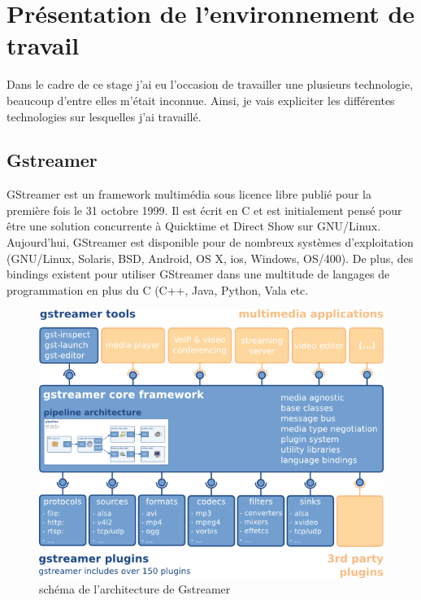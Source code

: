 \chapter{Présentation de l'environnement de travail}
Dans le cadre de ce stage j'ai eu l'occasion de travailler une plusieurs technologie, beaucoup d'entre elles m'était inconnue. Ainsi, je vais expliciter les différentes technologies sur lesquelles j'ai travaillé.

\section{Gstreamer}
\label{gstreamer}
GStreamer est un framework multimédia sous licence libre publié pour la première fois le 31 octobre 1999. Il est écrit en C et est initialement pensé pour être une solution concurrente à Quicktime et Direct Show sur GNU/Linux. Aujourd'hui, GStreamer est disponible pour de nombreux systèmes d'exploitation (GNU/Linux, Solaris, BSD, Android, OS X, ios, Windows, OS/400). De plus, des bindings existent pour utiliser GStreamer dans une multitude de langages de programmation en plus du C (C++, Java, Python, Vala etc.
\begin{figure}[!h]
  \centering
  \includegraphics[scale=0.7]{figures/gstreamer-overview}
  \caption{schéma de l'architecture de Gstreamer}
\end{figure}


